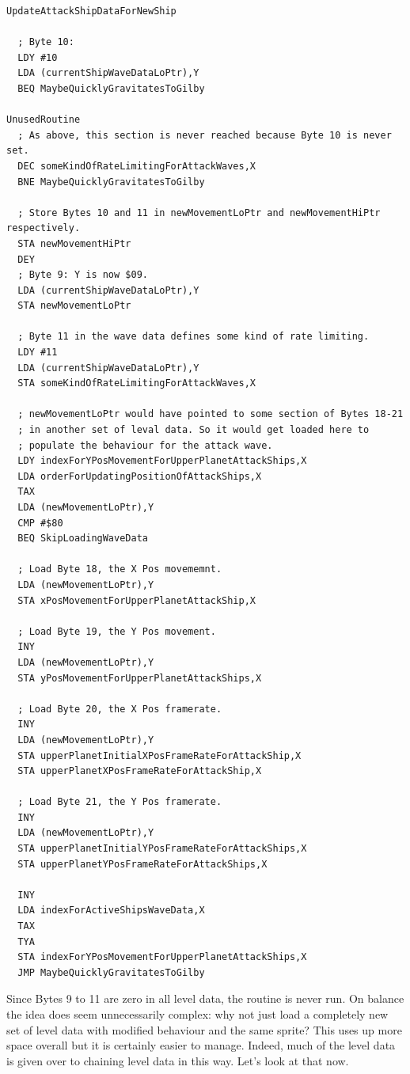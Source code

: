 \begin{lstlisting}
UpdateAttackShipDataForNewShip

  ; Byte 10:
  LDY #10
  LDA (currentShipWaveDataLoPtr),Y
  BEQ MaybeQuicklyGravitatesToGilby

UnusedRoutine
  ; As above, this section is never reached because Byte 10 is never set.
  DEC someKindOfRateLimitingForAttackWaves,X
  BNE MaybeQuicklyGravitatesToGilby

  ; Store Bytes 10 and 11 in newMovementLoPtr and newMovementHiPtr respectively.
  STA newMovementHiPtr
  DEY
  ; Byte 9: Y is now $09.
  LDA (currentShipWaveDataLoPtr),Y
  STA newMovementLoPtr

  ; Byte 11 in the wave data defines some kind of rate limiting.
  LDY #11
  LDA (currentShipWaveDataLoPtr),Y
  STA someKindOfRateLimitingForAttackWaves,X

  ; newMovementLoPtr would have pointed to some section of Bytes 18-21
  ; in another set of leval data. So it would get loaded here to
  ; populate the behaviour for the attack wave.
  LDY indexForYPosMovementForUpperPlanetAttackShips,X
  LDA orderForUpdatingPositionOfAttackShips,X
  TAX
  LDA (newMovementLoPtr),Y
  CMP #$80
  BEQ SkipLoadingWaveData

  ; Load Byte 18, the X Pos movememnt.
  LDA (newMovementLoPtr),Y
  STA xPosMovementForUpperPlanetAttackShip,X
  
  ; Load Byte 19, the Y Pos movement.
  INY
  LDA (newMovementLoPtr),Y
  STA yPosMovementForUpperPlanetAttackShips,X

  ; Load Byte 20, the X Pos framerate.
  INY
  LDA (newMovementLoPtr),Y
  STA upperPlanetInitialXPosFrameRateForAttackShip,X
  STA upperPlanetXPosFrameRateForAttackShip,X

  ; Load Byte 21, the Y Pos framerate.
  INY
  LDA (newMovementLoPtr),Y
  STA upperPlanetInitialYPosFrameRateForAttackShips,X
  STA upperPlanetYPosFrameRateForAttackShips,X

  INY
  LDA indexForActiveShipsWaveData,X
  TAX
  TYA
  STA indexForYPosMovementForUpperPlanetAttackShips,X
  JMP MaybeQuicklyGravitatesToGilby
\end{lstlisting}

Since Bytes 9 to 11 are zero in all level data, the routine is never run. On balance the idea does seem
unnecessarily complex: why not just load a completely new set of level data with modified behaviour and
the same sprite? This uses up more space overall but it is certainly easier to manage. Indeed, much
of the level data is given over to chaining level data in this way. Let's look at that now.


